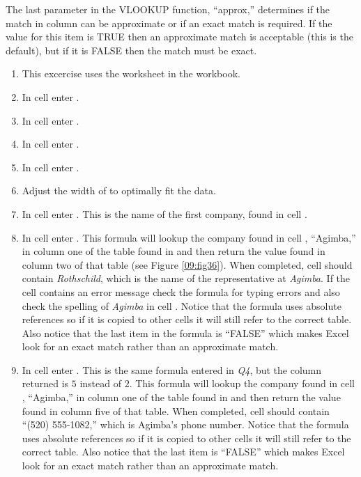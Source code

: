 The last parameter in the VLOOKUP function, ``approx,'' determines if the match in column can be approximate or if an exact match is required. If the value for this item is TRUE then an approximate match is acceptable (this is the default), but if it is FALSE then the match must be exact. 

\begin{enumerate}
	\item This excercise uses the  worksheet in the  workbook.
	\item In cell  enter .
	\item In cell  enter .
	\item In cell  enter .
	\item In cell  enter .
	\item Adjust the width of  to optimally fit the data.
	\item In cell  enter . This is the name of the first company, found in cell .
	\item In cell  enter . This formula will lookup the company found in cell , ``Agimba,'' in column one of the table found in  and then return the value found in column two of that table (see Figure \ref{09:fig36}). When completed, cell  should contain \textit{Rothschild}, which is the name of the representative at \textit{Agimba}. If the cell contains an error message check the formula for typing errors and also check the spelling of \textit{Agimba} in cell . Notice that the formula uses absolute references so if it is copied to other cells it will still refer to the correct table. Also notice that the last item in the formula is ``FALSE'' which makes Excel look for an exact match rather than an approximate match.
	\item In cell  enter . This is the same formula entered in \textit{Q4}, but the column returned is $ 5 $ instead of $ 2 $. This formula will lookup the company found in cell , ``Agimba,'' in column one of the table found in  and then return the value found in column five of that table. When completed, cell  should contain ``(520) 555-1082,'' which is Agimba's phone number.  Notice that the formula uses absolute references so if it is copied to other cells it will still refer to the correct table. Also notice that the last item is ``FALSE'' which makes Excel look for an exact match rather than an approximate match.

\end{enumerate}
